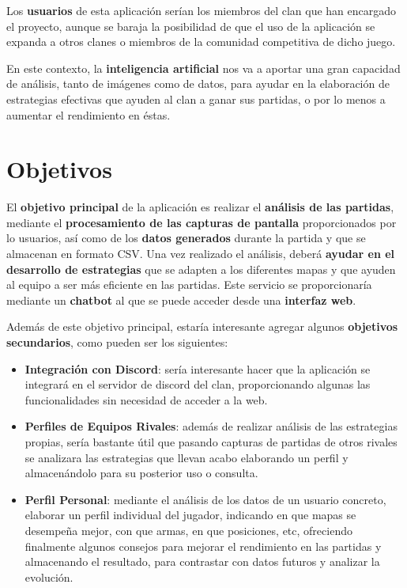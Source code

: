 Los \textbf{usuarios} de esta aplicación serían los miembros del clan que han encargado el proyecto, aunque se baraja la posibilidad de que el uso de la aplicación se expanda a otros clanes o miembros de la comunidad competitiva de dicho juego.

En este contexto, la \textbf{inteligencia artificial} nos va a aportar una gran capacidad de análisis, tanto de imágenes como de datos, para ayudar en la elaboración de estrategias efectivas que ayuden al clan a ganar sus partidas, o por lo menos a aumentar el rendimiento en éstas.

\section{Objetivos}
El \textbf{objetivo principal}  de la aplicación es realizar el \textbf{análisis de las partidas}, mediante el \textbf{procesamiento de las capturas de pantalla} proporcionados por lo usuarios, así como de los \textbf{datos generados} durante la partida y que se almacenan en formato CSV. Una vez realizado el análisis, deberá \textbf{ayudar en el desarrollo de estrategias} que se adapten a los diferentes mapas y que ayuden al equipo a ser más eficiente en las partidas. Este servicio se proporcionaría mediante un \textbf{chatbot} al que se puede acceder desde una \textbf{interfaz web}.

Además de este objetivo principal, estaría interesante agregar algunos \textbf{objetivos secundarios}, como pueden ser los siguientes:

\begin{itemize}
	\item \textbf{Integración con Discord}: sería interesante hacer que la aplicación se integrará en el servidor de discord del clan, proporcionando algunas las funcionalidades sin necesidad de acceder a la web.
	\item \textbf{Perfiles de Equipos Rivales}: además de realizar análisis de las estrategias propias, sería bastante útil que pasando capturas de partidas de otros rivales se analizara las estrategias que llevan acabo elaborando un perfil y almacenándolo para su posterior uso o consulta.
	\item \textbf{Perfil Personal}: mediante el análisis de los datos de un usuario concreto, elaborar un perfil individual del jugador,  indicando en que mapas se desempeña mejor, con que armas, en que posiciones, etc, ofreciendo finalmente algunos consejos para mejorar el rendimiento en las partidas y almacenando el resultado, para contrastar con datos futuros y analizar la evolución.
\end{itemize}

